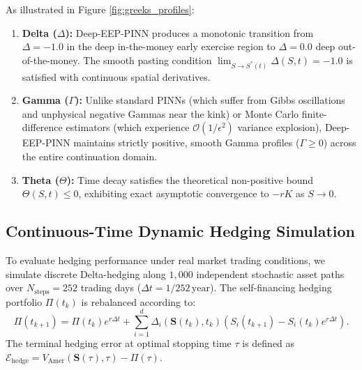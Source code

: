 \documentclass[11pt,a4paper]{article}
\begin{document}
As illustrated in Figure \ref{fig:greeks_profiles}:
\begin{enumerate}[label=(\alph*)]
    \item \textbf{Delta ($\Delta$):} Deep-EEP-PINN produces a monotonic transition from $\Delta = -1.0$ in the deep in-the-money early exercise region to $\Delta = 0.0$ deep out-of-the-money. The smooth pasting condition $\lim_{S \to S^*(t)} \Delta(S, t) = -1.0$ is satisfied with continuous spatial derivatives.
    \item \textbf{Gamma ($\Gamma$):} Unlike standard PINNs (which suffer from Gibbs oscillations and unphysical negative Gammas near the kink) or Monte Carlo finite-difference estimators (which experience $\mathcal{O}(1/\epsilon^2)$ variance explosion), Deep-EEP-PINN maintains strictly positive, smooth Gamma profiles ($\Gamma \ge 0$) across the entire continuation domain.
    \item \textbf{Theta ($\Theta$):} Time decay satisfies the theoretical non-positive bound $\Theta(S, t) \le 0$, exhibiting exact asymptotic convergence to $-rK$ as $S \to 0$.
\end{enumerate}

\subsection{Continuous-Time Dynamic Hedging Simulation}
To evaluate hedging performance under real market trading conditions, we simulate discrete Delta-hedging along $1,000$ independent stochastic asset paths over $N_{\text{steps}} = 252$ trading days ($\Delta t = 1/252\,\text{year}$). The self-financing hedging portfolio $\Pi(t_k)$ is rebalanced according to:
\begin{equation}
\label{eq:discrete_hedging_loop}
\Pi(t_{k+1}) = \Pi(t_k) e^{r \Delta t} + \sum_{i=1}^d \Delta_i(\mathbf{S}(t_k), t_k) \left( S_i(t_{k+1}) - S_i(t_k) e^{r \Delta t} \right).
\end{equation}
The terminal hedging error at optimal stopping time $\tau$ is defined as $\mathcal{E}_{\text{hedge}} = V_{\text{Amer}}(\mathbf{S}(\tau), \tau) - \Pi(\tau)$.
\end{document}
